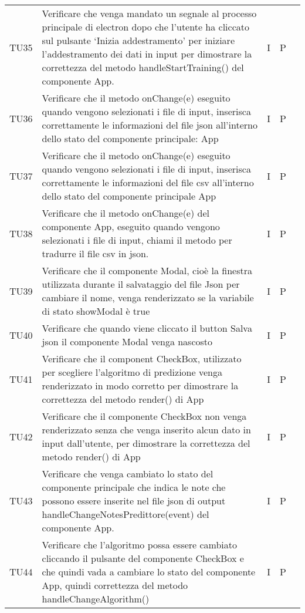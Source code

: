 \begin{longtable} {
		>{}p{15mm} 
		>{}p{79.5mm}
		>{}p{15mm} 
		>{}p{15mm}
		>{}p{0mm}}
	TU35	& Verificare che venga mandato un segnale al processo principale di electron dopo che l’utente ha cliccato sul pulsante ‘Inizia addestramento’ per iniziare l’addestramento dei dati in input per dimostrare la correttezza del metodo handleStartTraining() del componente App. & I & P &\TBstrut \\ [2mm]
	TU36	& Verificare che il metodo onChange(e) eseguito quando vengono selezionati i file di input, inserisca correttamente le informazioni del file json all'interno dello stato del componente principale: App & I & P &\TBstrut \\ [2mm]
	TU37	& Verificare che il metodo onChange(e) eseguito quando vengono selezionati i file di input, inserisca correttamente le informazioni del file csv all'interno dello stato del componente principale App & I & P &\TBstrut \\ [2mm]
	TU38	& Verificare che il metodo onChange(e) del componente App, eseguito quando vengono selezionati i file di input, chiami il metodo per tradurre il file csv in json. & I & P &\TBstrut \\ [2mm]
	TU39	& Verificare che il componente Modal, cioè la finestra utilizzata durante il salvataggio del file Json per cambiare il nome, venga renderizzato se la variabile di stato showModal è true & I & P &\TBstrut \\ [2mm]
	TU40	& Verificare che quando viene cliccato il button Salva json il componente Modal venga nascosto & I & P &\TBstrut \\ [2mm]
	TU41	& Verificare che il component CheckBox, utilizzato per scegliere l'algoritmo di predizione venga renderizzato in modo corretto per dimostrare la correttezza del metodo render() di App & I & P &\TBstrut \\ [2mm]
	TU42	& Verificare che il componente CheckBox non venga renderizzato senza che venga inserito alcun dato in input dall'utente, per dimostrare la correttezza del metodo render() di App & I & P &\TBstrut \\ [2mm]
	TU43	& Verificare che venga cambiato lo stato del componente principale che indica le note che possono essere inserite nel file json di output handleChangeNotesPredittore(event) del componente App. & I & P &\TBstrut \\ [2mm]
	TU44	& Verificare che l'algoritmo possa essere cambiato cliccando il pulsante del componente CheckBox e che quindi vada a cambiare lo stato del componente App, quindi correttezza del metodo handleChangeAlgorithm() & I & P &\TBstrut \\ [2mm]

\end{longtable}
